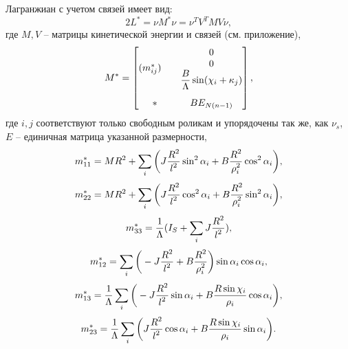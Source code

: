 Лагранжиан с учетом связей имеет вид:
$$ 2L^{*} = \nu M^*\nu = \nu^T V^TMV\nu, $$
где $M, V$ -- матрицы кинетической энергии и связей (см. приложение),
$$
M^* = \begin{bmatrix}
        (m^*_{ij}) \quad & \begin{matrix} 0 \\ 0 \\ \displaystyle\frac{\displaystyle B}{\displaystyle \Lambda}\sin(\chi_i+\kappa_j) \end{matrix} \\[25pt]
        *          & BE_{N(n-1)}                                                                  \\
    \end{bmatrix},
$$
где $i,j$ соответствуют только свободным роликам и упорядочены так же, как $\nu_s$, $E$ -- единичная матрица указанной размерности,
$$ m^*_{11} = MR^2 + \sum\limits_i \bigg( J\displaystyle\frac{\displaystyle R^2}{\displaystyle l^2}\sin^2\alpha_i + B\displaystyle\frac{\displaystyle R^2}{\displaystyle \rho_i^2}\cos^2\alpha_i\bigg), $$
$$ m^*_{22} = MR^2 + \sum\limits_i \bigg(J\displaystyle\frac{\displaystyle R^2}{\displaystyle l^2}\cos^2\alpha_i + B\displaystyle\frac{\displaystyle R^2}{\displaystyle \rho_i^2}\sin^2\alpha_i\bigg), $$
$$ m^*_{33} = \displaystyle\frac{\displaystyle 1}{\displaystyle \Lambda}(I_S + \sum\limits_i J\displaystyle\frac{\displaystyle R^2}{\displaystyle l^2}), $$
$$ m^*_{12} = \sum\limits_i \bigg(-J\displaystyle\frac{\displaystyle R^2}{\displaystyle l^2} + B\displaystyle\frac{\displaystyle R^2}{\displaystyle \rho_i^2}\bigg)\sin\alpha_i\cos\alpha_i, $$
$$ m^*_{13} = \displaystyle\frac{\displaystyle 1}{\displaystyle \Lambda}\sum\limits_i \bigg(-J\displaystyle\frac{\displaystyle R^2}{\displaystyle l^2}\sin\alpha_i +  B\displaystyle\frac{\displaystyle R\sin\chi_i}{\displaystyle \rho_i}\cos\alpha_i\bigg), $$
$$ m^*_{23} = \displaystyle\frac{\displaystyle 1}{\displaystyle \Lambda}\sum\limits_i \bigg(J\displaystyle\frac{\displaystyle R^2}{\displaystyle l^2}\cos\alpha_i +  B\displaystyle\frac{\displaystyle R\sin\chi_i}{\displaystyle \rho_i}\sin\alpha_i\bigg).$$


